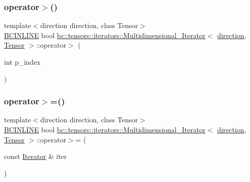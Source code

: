 \subsubsection{\texorpdfstring{operator$>$()}{operator>()}\hspace{0.1cm}{\footnotesize\ttfamily [2/2]}}
{\footnotesize\ttfamily template$<$direction direction, class Tensor$>$ \\
\hyperlink{common_8h_a6699e8b0449da5c0fafb878e59c1d4b1}{B\+C\+I\+N\+L\+I\+NE} bool \hyperlink{structbc_1_1tensors_1_1iterators_1_1Multidimensional__Iterator}{bc\+::tensors\+::iterators\+::\+Multidimensional\+\_\+\+Iterator}$<$ \hyperlink{namespacebc_1_1tensors_1_1iterators_ae76efe63fb9cb4985d5e4e6af0ebf296}{direction}, \hyperlink{namespacebc_a659391e47ab612be3ba6c18cf9c89159}{Tensor} $>$\+::operator$>$ (\begin{DoxyParamCaption}\item[{int}]{p\+\_\+index }\end{DoxyParamCaption})\hspace{0.3cm}{\ttfamily [inline]}}

\mbox{\label{structbc_1_1tensors_1_1iterators_1_1Multidimensional__Iterator_a5d28bafcc6d7d5a8d9d639a98cf4d952}} 
\subsubsection{\texorpdfstring{operator$>$=()}{operator>=()}\hspace{0.1cm}{\footnotesize\ttfamily [1/2]}}
{\footnotesize\ttfamily template$<$direction direction, class Tensor$>$ \\
\hyperlink{common_8h_a6699e8b0449da5c0fafb878e59c1d4b1}{B\+C\+I\+N\+L\+I\+NE} bool \hyperlink{structbc_1_1tensors_1_1iterators_1_1Multidimensional__Iterator}{bc\+::tensors\+::iterators\+::\+Multidimensional\+\_\+\+Iterator}$<$ \hyperlink{namespacebc_1_1tensors_1_1iterators_ae76efe63fb9cb4985d5e4e6af0ebf296}{direction}, \hyperlink{namespacebc_a659391e47ab612be3ba6c18cf9c89159}{Tensor} $>$\+::operator$>$= (\begin{DoxyParamCaption}\item[{const \hyperlink{structbc_1_1tensors_1_1iterators_1_1Multidimensional__Iterator_a12d78eb95b3b0fbee7c824f0a79c1513}{Iterator} \&}]{iter }\end{DoxyParamCaption})\hspace{0.3cm}{\ttfamily [inline]}}

